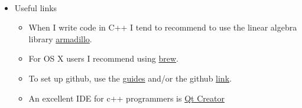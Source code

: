 \documentclass[%
oneside,                 %
final,                   %
10pt]{article}
\begin{document}
\paragraph{}
\begin{itemize}
\item Useful links
\begin{itemize}

 \item When I write code in C++ I tend to recommend to use the linear algebra library \href{{http://arma.sourceforge.net/}}{armadillo}. 

 \item For OS X users I recommend using \href{{http://brew.sh/}}{brew}.

 \item To set up github, use the \href{{https://guides.github.com/}}{guides} and/or the github \href{{https://github.com/}}{link}. 

 \item An excellent IDE for c++ programmers is \href{{http://www.qt.io/ide/}}{Qt Creator}
\end{itemize}

\noindent
\end{itemize}

\noindent




\end{document}
